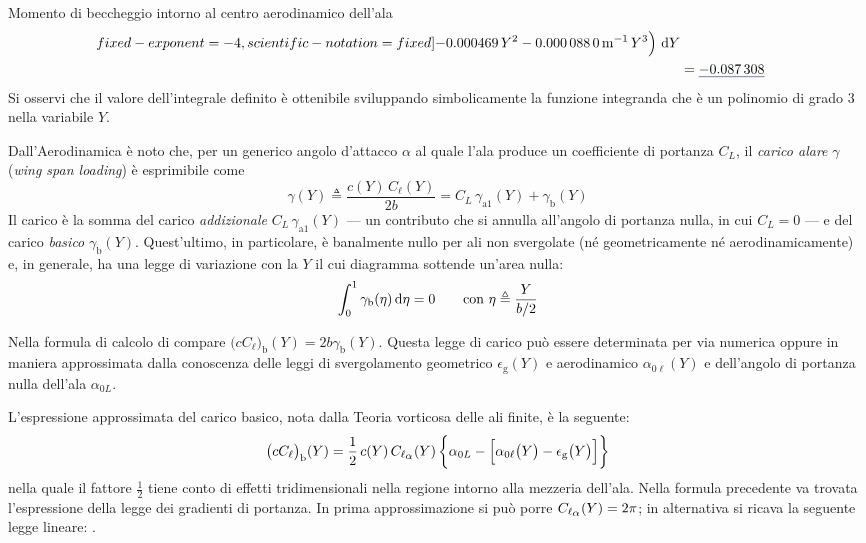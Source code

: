 \documentclass[[12pt,twoside]{book}
\begin{document}
\begin{myExampleX}{Momento di beccheggio intorno al centro aerodinamico dell'ala}{}
\[\begin{split}
        fixed-exponent=-4,
        scientific-notation=fixed %
        ]{\myCoeffCWing}{}\, Y^2
      \SI[round-mode=figures,round-precision=3,
        ]{\myCoeffDWing}{\metre^{-1}}\, Y^3
    \Big)
    \, \diff{Y}
\\
  & {}= \mathunderline{mydarkblue}{ \SI[round-precision=4]{\myCmZeroAWing}{} }
\end{split}
\]
Si osservi che il valore dell'integrale definito è ottenibile sviluppando simbolicamente
la funzione integranda che è un polinomio di grado $3$ nella variabile $Y$.

\smallskip
Dall'Aerodinamica è noto che, per un generico angolo d'attacco $\alpha$ al quale l'ala produce un
coefficiente di portanza $C_L$,
il \emph{carico alare} $\gamma$ (\emph{wing span loading}) è esprimibile come
\[
\gamma(Y) \triangleq \frac{c(Y) \, C_\ell (Y)}{2 b} = C_L \, \gamma_{\mathrm{a}1}(Y) + \gamma_\mathrm{b}(Y) 
\]
Il carico è la somma del carico \emph{addizionale} $C_L \, \gamma_{\mathrm{a}1}(Y)$
--- un contributo che si annulla all'angolo di portanza nulla, in cui $C_L=0$ ---
e del carico \emph{basico} $\gamma_\mathrm{b}(Y)$.
Quest'ultimo, in particolare, è banalmente nullo per ali non svergolate (né geometricamente né aerodinamicamente)
e, in generale, ha una legge di variazione con la $Y$ il cui diagramma sottende un'area nulla:
\[
\int_0^{1} \gamma_\mathrm{b}(\eta) \mathop{}\!\mathrm{d}{\eta} = 0 \qquad \text{con $\eta \triangleq \dfrac{Y}{b/2}$}
\]

Nella formula di calcolo di 
compare $\big(cC_{\ell}\big)_\mathrm{b}(Y) = 2b\gamma_\mathrm{b}(Y)$.
Questa legge di carico può essere determinata per via numerica oppure in maniera approssimata 
dalla conoscenza delle leggi di svergolamento geometrico $\epsilon_\mathrm{g}(Y)$ e aerodinamico
$\alpha_{0\ell}(Y)$ e dell'angolo di portanza nulla dell'ala $\alpha_{0L}$.

L'espressione approssimata del carico basico, nota dalla Teoria vorticosa delle ali finite, è la seguente:
\[
\big(cC_{\ell}\big)_\mathrm{b}(Y)
  = \frac{1}{2} \, c(Y) \, C_{\ell_\mathlarger{\alpha}}(Y) \,
    \bigg\{ \alpha_{0L} - \Big[ \alpha_{0\ell}\big(Y\big) - \epsilon_\mathrm{g}\big(Y\big) \Big] \bigg\}
\]
nella quale il fattore $\frac{1}{2}$ tiene conto di effetti tridimensionali nella regione intorno
alla mezzeria dell'ala.
%
Nella formula precedente va trovata l'espressione della legge dei gradienti di portanza.
In prima approssimazione si può porre 
$C_{\ell_\mathlarger{\alpha}} (Y)=2\pi$; in alternativa si ricava la seguente legge lineare:
.


\end{myExampleX}
\end{document}
